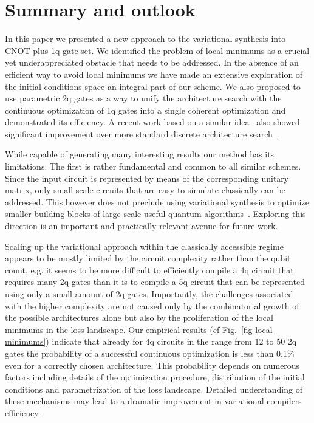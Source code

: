 \documentclass[twocolumn, amsfonts, amssymb, aps, nofootinbib]{revtex4-2}
\newcommand{\CX}{\textsf{CNOT }}
\begin{document}
\section{Summary and outlook \label{sec last}}

In this paper we presented a new approach to the variational synthesis into \CX plus 1q gate set. We identified the problem of local minimums as a crucial yet underappreciated obstacle that needs to be addressed. In the absence of an efficient way to avoid local minimums we have made an extensive exploration of the initial conditions space an integral part of our scheme. We also proposed to use parametric 2q gates as a way to unify the architecture search with the continuous optimization of 1q gates into a single coherent optimization and demonstrated its efficiency. A recent work based on a similar idea~\cite{Rakyta2022} also showed significant improvement over more standard discrete architecture search~\cite{Smith2021}.

While capable of generating many interesting results our method has its limitations. The first is rather fundamental and common to all similar schemes. Since the input circuit is represented by means of the corresponding unitary matrix, only small scale circuits that are easy to simulate classically can be addressed. This however does not preclude using variational synthesis to optimize smaller building blocks of large scale useful quantum algorithms~\cite{Younis2021}. Exploring this direction is an important and practically relevant avenue for future work.

Scaling up the variational approach within the classically accessible regime appears to be mostly limited by the circuit complexity rather than the qubit count, e.g. it seems to be more difficult to efficiently compile a 4q circuit that requires many 2q gates than it is to compile a 5q circuit that can be represented using only a small amount of 2q gates. Importantly, the challenges associated with the higher complexity are not caused only by the combinatorial growth of the possible architectures alone but also by the proliferation of the local minimums in the loss landscape. Our empirical results (cf Fig.~\ref{fig local minimums}) indicate that already for 4q circuits in the range from 12 to 50 2q gates the probability of a successful continuous optimization is less than 0.1\% even for a correctly chosen architecture. This probability depends on numerous factors including details of the optimization procedure, distribution of the initial conditions and parametrization of the loss landscape. Detailed understanding of these mechanisms may lead to a dramatic improvement in variational compilers efficiency.
\end{document}
